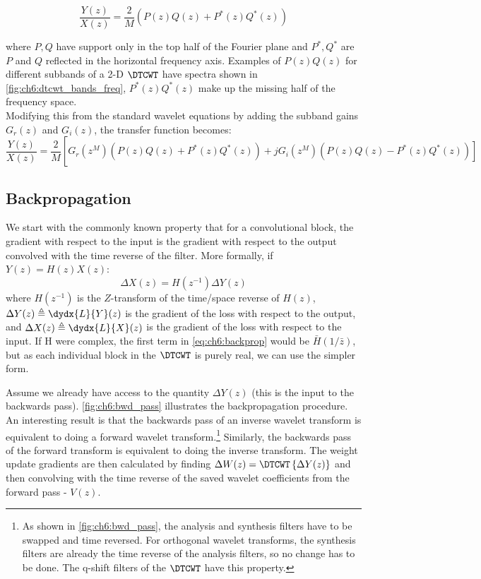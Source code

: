 \begin{equation}\label{eq:ch6:end_to_end1}
\frac{Y(z)}{X(z)} = \frac{2}{M}\left(P(z)Q(z) + P^*(z)Q^*(z)\right)
\end{equation}

where $P, Q$ have support only in the top half of the Fourier plane and $P^*,
Q^*$ are $P$ and $Q$ reflected in the horizontal frequency axis. Examples of
$P(z)Q(z)$ for different subbands of a 2-D $\DTCWT$ have spectra shown in
\autoref{fig:ch6:dtcwt_bands_freq}, $P^*(z)Q^*(z)$ make up the missing half of
the frequency space.\\ 

Modifying this from the standard wavelet equations by
adding the subband gains $G_r(z)$ and $G_i(z)$, the transfer function becomes:
\begin{equation}\label{eq:ch6:end_to_end2}
    \frac{Y(z)}{X(z)} = \frac{2}{M} \left[ \right. G_r(z^M) \left( P(z)Q(z) + P^*(z)Q^*(z) \right) +  
      \left. jG_i(z^M) \left(P(z)Q(z)-P^*(z)Q^*(z) \right) \right]
\end{equation}

\subsection{Backpropagation}
We start with the commonly known property that for a convolutional block, the
gradient with respect to the input is the gradient with respect to the output
convolved with the time reverse of the filter. More formally, if 
$Y(z) = H(z) X(z)$:
\begin{equation}\label{eq:ch6:backprop}
\Delta X(z) = H(z^{-1}) \Delta Y(z)
\end{equation}
where $H(z^{-1})$ is the $Z$-transform of the time/space reverse of $H(z)$,
$\Delta Y(z) \triangleq \dydx{L}{Y}(z)$ is the gradient of the loss with respect
to the output, and $\Delta X(z) \triangleq \dydx{L}{X}(z)$ is the gradient of
the loss with respect to the input. If H were complex, the first term in
\autoref{eq:ch6:backprop} would be $\bar{H}(1/\bar{z})$, but as each individual
block in the $\DTCWT$ is purely real, we can use the simpler form. 

Assume we already have access to the quantity $\Delta Y(z)$ (this is the input
to the backwards pass). \autoref{fig:ch6:bwd_pass} illustrates the
backpropagation procedure. An interesting result is that the backwards pass of
an inverse wavelet transform is equivalent to doing a forward wavelet
transform.\footnote{As shown in \autoref{fig:ch6:bwd_pass}, the analysis and
synthesis filters have to be swapped and time reversed. For orthogonal wavelet
transforms, the synthesis filters are already the time reverse of the analysis
filters, so no change has to be done. The q-shift filters of the $\DTCWT$
\cite{kingsbury_design_2003} have this property.} Similarly, the backwards pass
of the forward transform is equivalent to doing the inverse transform. The
weight update gradients are then calculated by finding 
$\Delta W(z) = \DTCWT\left\{ \Delta Y(z) \right\}$ and then convolving with the 
time reverse of the saved wavelet coefficients from the forward pass - $V(z)$.

